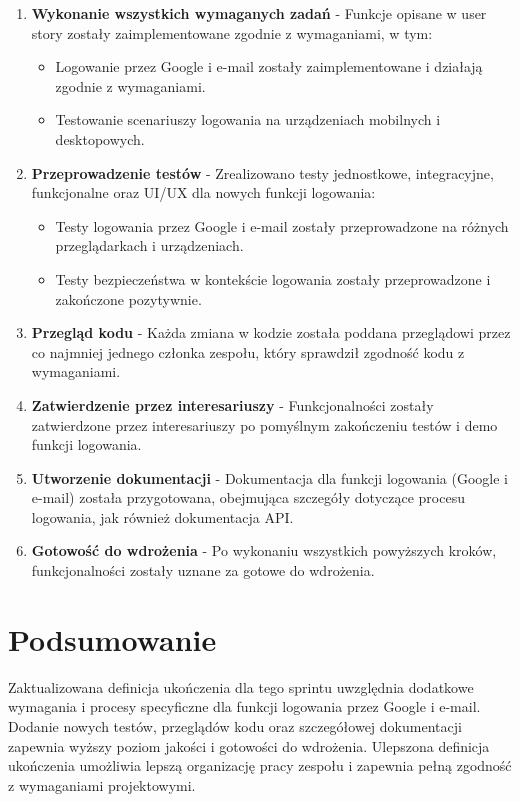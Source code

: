 \documentclass[12pt,a4paper,colorlinks=true,linkcolor=NavyBlue,citecolor=red,urlcolor=NavyBlue]{book}
\begin{document}
\begin{enumerate}[topsep=0pt, itemsep=0.3em]
    \item \textbf{Wykonanie wszystkich wymaganych zadań} - Funkcje opisane w user story zostały zaimplementowane zgodnie z wymaganiami, w tym:
    \begin{itemize}[topsep=0pt, itemsep=0.3em]
        \item Logowanie przez Google i e-mail zostały zaimplementowane i działają zgodnie z wymaganiami.
        \item Testowanie scenariuszy logowania na urządzeniach mobilnych i desktopowych.
    \end{itemize}
    \item \textbf{Przeprowadzenie testów} - Zrealizowano testy jednostkowe, integracyjne, funkcjonalne oraz UI/UX dla nowych funkcji logowania:
    \begin{itemize}[topsep=0pt, itemsep=0.3em]
        \item Testy logowania przez Google i e-mail zostały przeprowadzone na różnych przeglądarkach i urządzeniach.
        \item Testy bezpieczeństwa w kontekście logowania zostały przeprowadzone i zakończone pozytywnie.
    \end{itemize}
    \item \textbf{Przegląd kodu} - Każda zmiana w kodzie została poddana przeglądowi przez co najmniej jednego członka zespołu, który sprawdził zgodność kodu z wymaganiami.
    \item \textbf{Zatwierdzenie przez interesariuszy} - Funkcjonalności zostały zatwierdzone przez interesariuszy po pomyślnym zakończeniu testów i demo funkcji logowania. 
    \item \textbf{Utworzenie dokumentacji} - Dokumentacja dla funkcji logowania (Google i e-mail) została przygotowana, obejmująca szczegóły dotyczące procesu logowania, jak również dokumentacja API.
    \item \textbf{Gotowość do wdrożenia} - Po wykonaniu wszystkich powyższych kroków, funkcjonalności zostały uznane za gotowe do wdrożenia.
\end{enumerate}

\section{Podsumowanie}

Zaktualizowana definicja ukończenia dla tego sprintu uwzględnia dodatkowe wymagania i procesy specyficzne dla funkcji logowania przez Google i e-mail. Dodanie nowych testów, przeglądów kodu oraz szczegółowej dokumentacji zapewnia wyższy poziom jakości i gotowości do wdrożenia. Ulepszona definicja ukończenia umożliwia lepszą organizację pracy zespołu i zapewnia pełną zgodność z wymaganiami projektowymi.
\end{document}
